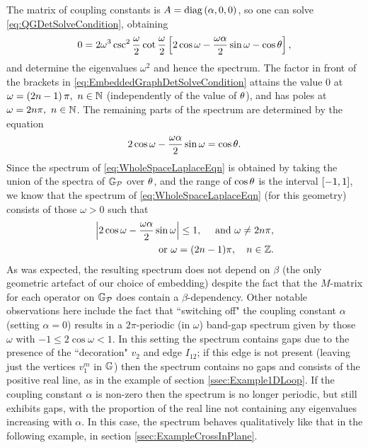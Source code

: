 The matrix of coupling constants is $A=\mathrm{diag}\left( \alpha, 0, 0 \right)$, so one can solve \eqref{eq:QGDetSolveCondition}, obtaining
\begin{align} \label{eq:EmbeddedGraphDetSolveCondition}
	0 = 2\omega^3\csc^2\frac{\omega}{2}\cot\frac{\omega}{2}\left[  2\cos\omega - \frac{\omega\alpha}{2}\sin\omega - \cos\theta \right],
\end{align}
and determine the eigenvalues $\omega^2$ and hence the spectrum.
The factor in front of the brackets in \eqref{eq:EmbeddedGraphDetSolveCondition} attains the value 0 at $\omega=\left( 2n-1 \right)\pi, \ n\in\mathbb{N}$ (independently of the value of $\theta$), and has poles at $\omega=2n\pi, \ n\in\naturals$.
The remaining parts of the spectrum are determined by the equation
\begin{align*}
	2\cos\omega - \frac{\omega\alpha}{2}\sin\omega = \cos\theta.
\end{align*}
Since the spectrum of \eqref{eq:WholeSpaceLaplaceEqn} is obtained by taking the union of the spectra of $\mathbb{G}_{\mathcal{P}}$ over $\theta$, and the range of $\cos\theta$ is the interval $\left[ -1,1 \right]$, we know that the spectrum of \eqref{eq:WholeSpaceLaplaceEqn} (for this geometry) consists of those $\omega>0$ such that
\begin{align*}
	\left\lvert  2\cos\omega - \frac{\omega\alpha}{2}\sin\omega \right\rvert \leq 1, 
	\quad\text{ and }\omega\neq 2n\pi, \\
	\text{or} \ \omega= (2n-1)\pi, \quad n\in\mathbb{Z}.
\end{align*}
As was expected, the resulting spectrum does not depend on $\beta$ (the only geometric artefact of our choice of embedding) despite the fact that the $M$-matrix for each operator on $\mathbb{G}_{\mathcal{P}}$ does contain a $\beta$-dependency.
Other notable observations here include the fact that ``switching off" the coupling constant $\alpha$ (setting $\alpha=0$) results in a $2\pi$-periodic (in $\omega$) band-gap spectrum given by those $\omega$ with $-1\leq 2\cos\omega < 1$.
In this setting the spectrum contains gaps due to the presence of the ``decoration" $v_2$ and edge $I_{12}$; if this edge is not present (leaving just the vertices $v_1^m$ in $\mathbb{G}$) then the spectrum contains no gaps and consists of the positive real line, as in the example of section \ref{ssec:Example1DLoop}.
If the coupling constant $\alpha$ is non-zero then the spectrum is no longer periodic, but still exhibits gaps, with the proportion of the real line not containing any eigenvalues increasing with $\alpha$.
In this case, the spectrum behaves qualitatively like that in the following example, in section \ref{ssec:ExampleCrossInPlane}.

